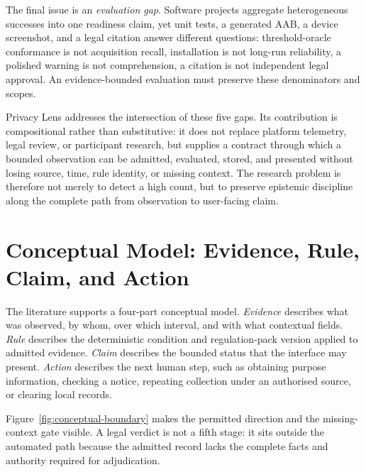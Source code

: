 The final issue is an \emph{evaluation gap}. Software projects aggregate heterogeneous successes into one readiness claim, yet unit tests, a generated AAB, a device screenshot, and a legal citation answer different questions: threshold-oracle conformance is not acquisition recall, installation is not long-run reliability, a polished warning is not comprehension, a citation is not independent legal approval. An evidence-bounded evaluation must preserve these denominators and scopes.

Privacy Lens addresses the intersection of these five gaps. Its contribution is compositional rather than substitutive: it does not replace platform telemetry, legal review, or participant research, but supplies a contract through which a bounded observation can be admitted, evaluated, stored, and presented without losing source, time, rule identity, or missing context. The research problem is therefore not merely to detect a high count, but to preserve epistemic discipline along the complete path from observation to user-facing claim.

\section{Conceptual Model: Evidence, Rule, Claim, and Action}

The literature supports a four-part conceptual model. \emph{Evidence} describes what was observed, by whom, over which interval, and with what contextual fields. \emph{Rule} describes the deterministic condition and regulation-pack version applied to admitted evidence. \emph{Claim} describes the bounded status that the interface may present. \emph{Action} describes the next human step, such as obtaining purpose information, checking a notice, repeating collection under an authorised source, or clearing local records.

Figure~\ref{fig:conceptual-boundary} makes the permitted direction and the missing-context gate visible. A legal verdict is not a fifth stage: it sits outside the automated path because the admitted record lacks the complete facts and authority required for adjudication.

